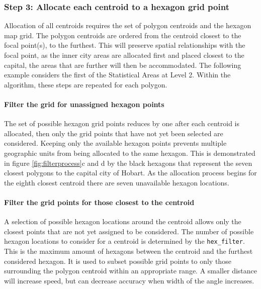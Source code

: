 \hypertarget{step-3-allocate-each-centroid-to-a-hexagon-grid-point}{%
\subsubsection{Step 3: Allocate each centroid to a hexagon grid
point}\label{step-3-allocate-each-centroid-to-a-hexagon-grid-point}}

Allocation of all centroids requires the set of polygon centroids and
the hexagon map grid. The polygon centroids are ordered from the
centroid closest to the focal point(s), to the furthest. This will
preserve spatial relationships with the focal point, as the inner city
areas are allocated first and placed closest to the capital, the areas
that are further will then be accommodated. The following example
considers the first of the Statistical Areas at Level 2. Within the
algorithm, these steps are repeated for each polygon.

\hypertarget{filter-the-grid-for-unassigned-hexagon-points}{%
\paragraph{Filter the grid for unassigned hexagon
points}\label{filter-the-grid-for-unassigned-hexagon-points}}

The set of possible hexagon grid points reduces by one after each
centroid is allocated, then only the grid points that have not yet been
selected are considered. Keeping only the available hexagon points
prevents multiple geographic units from being allocated to the same
hexagon. This is demonstrated in figure \ref{fig:filterprocess}c and d
by the black hexagons that represent the seven closest polygons to the
capital city of Hobart. As the allocation process begins for the eighth
closest centroid there are seven unavailable hexagon locations.

\hypertarget{filter-the-grid-points-for-those-closest-to-the-centroid}{%
\paragraph{Filter the grid points for those closest to the
centroid}\label{filter-the-grid-points-for-those-closest-to-the-centroid}}

A selection of possible hexagon locations around the centroid allows
only the closest points that are not yet assigned to be considered. The
number of possible hexagon locations to consider for a centroid is
determined by the \texttt{hex\_filter}. This is the maximum amount of
hexagons between the centroid and the furthest considered hexagon. It is
used to subset possible grid points to only those surrounding the
polygon centroid within an appropriate range. A smaller distance will
increase speed, but can decrease accuracy when width of the angle
increases.


